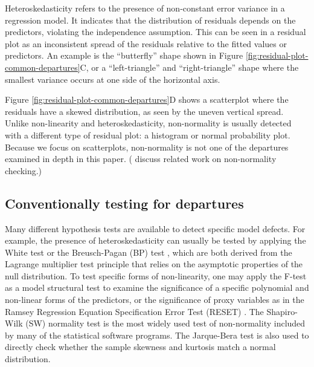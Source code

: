 \documentclass[]{interact}
\theoremstyle{plain}%
\theoremstyle{definition}
\theoremstyle{remark}
\begin{document}
Heteroskedasticity refers to the presence of non-constant error variance
in a regression model. It indicates that the distribution of residuals
depends on the predictors, violating the independence assumption. This
can be seen in a residual plot as an inconsistent spread of the
residuals relative to the fitted values or predictors. An example is the
``butterfly'' shape shown in Figure
\ref{fig:residual-plot-common-departures}C, or a ``left-triangle'' and
``right-triangle'' shape where the smallest variance occurs at one side
of the horizontal axis.

Figure \ref{fig:residual-plot-common-departures}D shows a scatterplot
where the residuals have a skewed distribution, as seen by the uneven
vertical spread. Unlike non-linearity and heteroskedasticity,
non-normality is usually detected with a different type of residual
plot: a histogram or normal probability plot. Because we focus on
scatterplots, non-normality is not one of the departures examined in
depth in this paper. (\citet{loy2016variations} discuss related work on
non-normality checking.)

\hypertarget{conventionally-testing-for-departures}{%
\subsection{Conventionally testing for
departures}\label{conventionally-testing-for-departures}}

Many different hypothesis tests are available to detect specific model
defects. For example, the presence of heteroskedasticity can usually be
tested by applying the White test \citep{white1980heteroskedasticity} or
the Breusch-Pagan (BP) test \citep{breusch1979simple}, which are both
derived from the Lagrange multiplier test \citep{silvey1959lagrangian}
principle that relies on the asymptotic properties of the null
distribution. To test specific forms of non-linearity, one may apply the
F-test as a model structural test to examine the significance of a
specific polynomial and non-linear forms of the predictors, or the
significance of proxy variables as in the Ramsey Regression Equation
Specification Error Test (RESET) \citep{ramsey1969tests}. The
Shapiro-Wilk (SW) normality test \citep{shapiro1965analysis} is the most
widely used test of non-normality included by many of the statistical
software programs. The Jarque-Bera test \citep{jarque1980efficient} is
also used to directly check whether the sample skewness and kurtosis
match a normal distribution.
\end{document}
